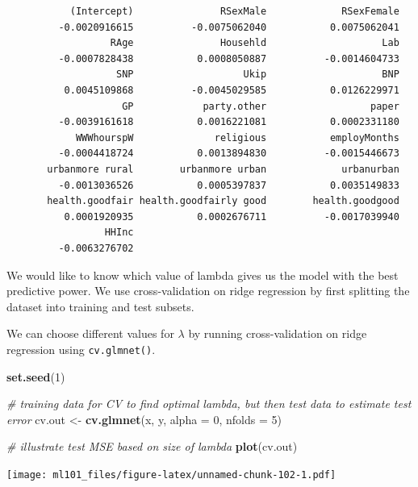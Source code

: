 \documentclass[]{article}
\newenvironment{Shaded}{\begin{snugshade}}{\end{snugshade}}
\newcommand{\CommentTok}[1]{\textcolor[rgb]{0.56,0.35,0.01}{\textit{#1}}}
\newcommand{\DataTypeTok}[1]{\textcolor[rgb]{0.13,0.29,0.53}{#1}}
\newcommand{\DecValTok}[1]{\textcolor[rgb]{0.00,0.00,0.81}{#1}}
\newcommand{\KeywordTok}[1]{\textcolor[rgb]{0.13,0.29,0.53}{\textbf{#1}}}
\newcommand{\NormalTok}[1]{#1}
\newcommand{\OperatorTok}[1]{\textcolor[rgb]{0.81,0.36,0.00}{\textbf{#1}}}
\newcommand{\StringTok}[1]{\textcolor[rgb]{0.31,0.60,0.02}{#1}}
\begin{document}
\begin{verbatim}
           (Intercept)               RSexMale             RSexFemale 
         -0.0020916615          -0.0075062040           0.0075062041 
                  RAge               Househld                    Lab 
         -0.0007828438           0.0008050887          -0.0014604733 
                   SNP                   Ukip                    BNP 
          0.0045109868          -0.0045029585           0.0126229971 
                    GP            party.other                  paper 
         -0.0039161618           0.0016221081           0.0002331180 
            WWWhourspW              religious           employMonths 
         -0.0004418724           0.0013894830          -0.0015446673 
       urbanmore rural        urbanmore urban             urbanurban 
         -0.0013036526           0.0005397837           0.0035149833 
       health.goodfair health.goodfairly good        health.goodgood 
          0.0001920935           0.0002676711          -0.0017039940 
                 HHInc 
         -0.0063276702 
\end{verbatim}

We would like to know which value of lambda gives us the model with the best predictive power. We use cross-validation on ridge regression by first splitting the dataset into training and test subsets.

We can choose different values for \(\lambda\) by running cross-validation on ridge regression using \texttt{cv.glmnet()}.

\begin{Shaded}
\begin{Highlighting}[]
\KeywordTok{set.seed}\NormalTok{(}\DecValTok{1}\NormalTok{)}

\CommentTok{# training data for CV to find optimal lambda, but then test data to estimate test error}
\NormalTok{cv.out <-}\StringTok{ }\KeywordTok{cv.glmnet}\NormalTok{(x, y, }\DataTypeTok{alpha =} \DecValTok{0}\NormalTok{, }\DataTypeTok{nfolds =} \DecValTok{5}\NormalTok{)}

\CommentTok{# illustrate test MSE based on size of lambda}
\KeywordTok{plot}\NormalTok{(cv.out)}
\end{Highlighting}
\end{Shaded}

\texttt{[image: ml101\_files/figure-latex/unnamed-chunk-102-1.pdf]}

\begin{Shaded}
\end{Shaded}
\end{document}
